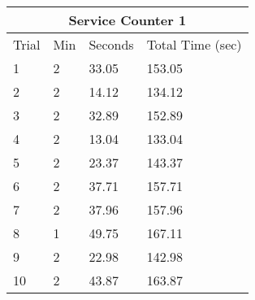 \documentclass[11pt]{article}
\begin{document}
\begin{center}
\begin{tabular}[h?]
{|p{2.2cm}|p{2.2cm}|p{2.2cm}|p{2.6cm}|}
\hline
\multicolumn{4}{|c|}{Service Counter 1} \\
\hline
Trial & Min & Seconds & Total Time (sec) \\
\hline
 1 & 2 & 33.05 & 153.05 \\
 2 & 2 & 14.12 & 134.12 \\
 3 & 2 & 32.89 & 152.89 \\
 4 & 2 & 13.04 & 133.04 \\
 5 & 2 & 23.37 & 143.37 \\
 6 & 2 & 37.71 & 157.71 \\
 7 & 2 & 37.96 & 157.96 \\
 8 & 1 & 49.75 & 167.11 \\
 9 & 2 & 22.98 & 142.98 \\
 10 & 2 & 43.87 & 163.87 \\
\hline
\end{tabular}
\end{center}
\end{document}
